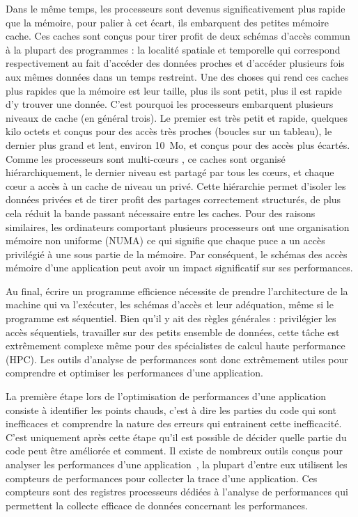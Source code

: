 Dans le même temps, les processeurs sont devenus significativement plus rapide que la mémoire, pour palier à cet écart, ils embarquent des petites mémoire cache.
Ces caches sont conçus pour tirer profit de deux schémas d'accès commun à la plupart des programmes : la localité spatiale et temporelle qui correspond respectivement au fait d'accéder des données proches et d'accéder plusieurs fois aux mêmes données dans un temps restreint.
Une des choses qui rend ces caches plus rapides que la mémoire est leur taille, plus ils sont petit, plus il est rapide d'y trouver une donnée.
C'est pourquoi les processeurs embarquent plusieurs niveaux de cache (en général trois).
Le premier est très petit et rapide, quelques kilo octets et conçus pour des accès très proches (boucles sur un tableau), le dernier plus grand et lent, environ \SI{10}{Mo}, et conçus pour des accès plus écartés.
Comme les processeurs sont multi-cœurs , ce caches sont organisé hiérarchiquement, le dernier niveau est partagé par tous les cœurs, et chaque cœur a accès à un cache de niveau un privé.
Cette hiérarchie permet d'isoler les données privées et de tirer profit des partages correctement structurés, de plus cela réduit la bande passant nécessaire entre les caches.
Pour des raisons similaires, les ordinateurs comportant plusieurs processeurs ont une organisation mémoire non uniforme (NUMA) ce qui signifie que chaque puce a un accès privilégié à une sous partie de la mémoire.
Par conséquent, le schémas des accès mémoire d'une application peut avoir un impact significatif sur ses performances.

Au final, écrire un programme efficience nécessite de prendre l'architecture de la machine qui va l'exécuter, les schémas d'accès et leur  adéquation, même si le programme est séquentiel.
Bien qu'il y ait des règles générales : privilégier les accès séquentiels, travailler sur des petits ensemble de données, cette t\^ache est extrêmement complexe même pour des spécialistes de calcul haute performance (HPC).
Les outils d'analyse de performances sont donc extrêmement utiles pour comprendre et optimiser les performances d'une application.

La première étape lors de l'optimisation de performances d'une application consiste à identifier les points chauds, c'est à dire les parties du code qui sont inefficaces et comprendre la nature des erreurs qui entrainent cette inefficacité.
C'est uniquement après cette étape qu'il est possible de décider quelle partie du code peut être améliorée et comment.
Il existe de nombreux outils conçus pour analyser les performances d'une application~\cite{Pillet95PARAVER,Browne00Portable,Shende06Tau,Treibig10LIKWID,Adhianto10HPCTOOLKIT}, la plupart d'entre eux utilisent les compteurs de performances pour collecter la trace d'une application.
Ces compteurs sont des registres processeurs dédiées à l'analyse de performances qui permettent la collecte efficace de données concernant les performances.

